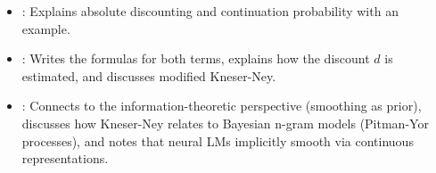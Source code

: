 \begin{interviewq}

\goodgreat
\begin{itemize}
    \item {}: Explains absolute discounting and continuation
          probability with an example.
    \item {}: Writes the formulas for both terms, explains how
          the discount $d$ is estimated, and discusses modified Kneser-Ney.
    \item {}: Connects to the information-theoretic perspective
          (smoothing as prior), discusses how Kneser-Ney relates to Bayesian
          n-gram models (Pitman-Yor processes), and notes that neural LMs
          implicitly smooth via continuous representations.
\end{itemize}

\end{interviewq}

\vspace{0.5em}

